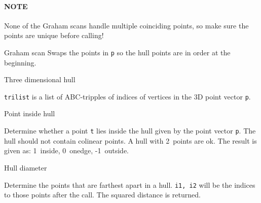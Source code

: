 
\paragraph{NOTE} None of the Graham scans handle multiple coinciding points,
so make sure the points are unique before calling!

\begin{algorithm}{Graham scan}
\desc
Swaps the points in {\tt p} so the hull points are in order at the beginning.
\end{algorithm}


\begin{algorithm}{Three dimensional hull}


\desc
{\tt trilist} is a list of ABC-tripples of indices of vertices in the 3D
point vector {\tt p}.
\end{algorithm}


\begin{algorithm}{Point inside hull}

\desc
Determine whether a point {\tt t} lies inside the hull given by the
point vector {\tt p}. The hull should not contain colinear points. A hull with
2~points are ok. The result is given as: 1~inside, 0~onedge, -1~outside.
\end{algorithm}


\begin{algorithm}{Hull diameter}

\desc
Determine the points that are farthest apart in a hull.
{\tt i1, i2} will be the indices to those points after the call.
The squared distance is returned.
\end{algorithm}


